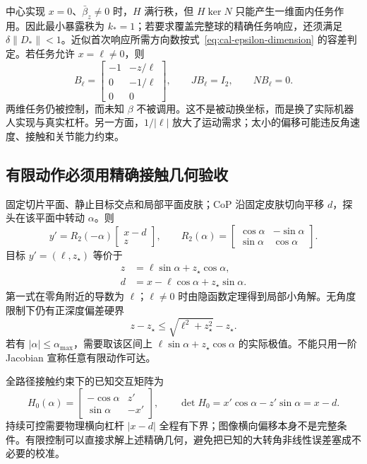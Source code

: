 \documentclass[11pt,a4paper]{article}
\numberwithin{equation}{section}
\theoremstyle{definition}
\begin{document}
中心实现 $x=0$、$\bar\beta_z\ne0$ 时，$H$ 满行秩，但 $H\ker N$ 只能产生一维面内任务作用。因此最小暴露秩为 $k_*=1$；若要求覆盖完整球的精确任务响应，还须满足 $\delta\|D_*\|<1$。近似首次响应所需方向数按式~\eqref{eq:cal-epsilon-dimension} 的容差判定。若任务允许 $x=\ell\ne0$，则
\begin{equation}
 B_\ell=
 \begin{bmatrix}
 -1&-z/\ell\\0&-1/\ell\\0&0
 \end{bmatrix},\qquad
 JB_\ell=I_2,\qquad NB_\ell=0.
\end{equation}
两维任务仍被控制，而未知 $\beta$ 不被调用。这不是被动换坐标，而是换了实际机器人实现与真实杠杆。另一方面，$1/|\ell|$ 放大了运动需求；太小的偏移可能违反角速度、接触和关节能力约束。

\subsection{有限动作必须用精确接触几何验收}
固定切片平面、静止目标交点和局部平面皮肤；CoP 沿固定皮肤切向平移 $d$，探头在该平面中转动 $\alpha$。则
\begin{equation}
 y'=R_2(-\alpha)\begin{bmatrix}x-d\\z\end{bmatrix},\qquad
 R_2(\alpha)=\begin{bmatrix}\cos\alpha&-\sin\alpha\\\sin\alpha&\cos\alpha\end{bmatrix}.
\end{equation}
目标 $y'=(\ell,z_\star)$ 等价于
\begin{align}
 z&=\ell\sin\alpha+z_\star\cos\alpha,\\
 d&=x-\ell\cos\alpha+z_\star\sin\alpha.
\end{align}
第一式在零角附近的导数为 $\ell$；$\ell\ne0$ 时由隐函数定理得到局部小角解。无角度限制下仍有正深度偏差硬界
\begin{equation}
 z-z_\star\le\sqrt{\ell^2+z_\star^2}-z_\star.
\end{equation}
若有 $|\alpha|\le\alpha_{\max}$，需要取该区间上 $\ell\sin\alpha+z_\star\cos\alpha$ 的实际极值。不能只用一阶 Jacobian 宣称任意有限动作可达。

全路径接触约束下的已知交互矩阵为
\begin{equation}
 H_0(\alpha)=\begin{bmatrix}-\cos\alpha&z'\\\sin\alpha&-x'\end{bmatrix},\qquad
 \det H_0=x'\cos\alpha-z'\sin\alpha=x-d.
\end{equation}
持续可控需要物理横向杠杆 $|x-d|$ 全程有下界；图像横向偏移本身不是完整条件。有限控制可以直接求解上述精确几何，避免把已知的大转角非线性误差塞成不必要的校准。
\end{document}
